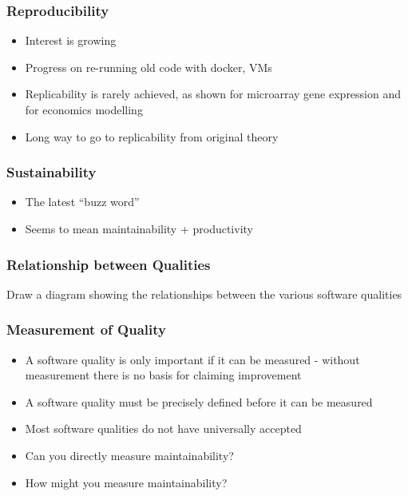 \documentclass[t,12pt,numbers,fleqn]{beamer}
\begin{document}

\begin{frame}
\frametitle{Reproducibility}

\begin{itemize}
\item Interest is growing \cite{BenureauAndRougier2017, BaileyEtAl2016}
\item Progress on re-running old code with docker, VMs
\item Replicability is rarely achieved, as shown for microarray gene expression
  \cite{IoannidisEtAl2009} and for economics modelling
  \cite{IonescuAndJansson2013}
\item Long way to go to replicability from original theory
\end{itemize}

\end{frame}

\begin{frame}
\frametitle{Sustainability}

\begin{itemize}
\item The latest ``buzz word''
\item Seems to mean maintainability + productivity
\end{itemize}

\end{frame}


\begin{frame}
\frametitle{Relationship between Qualities}

Draw a diagram showing the relationships between the various software qualities

\end{frame}


\begin{frame}
\frametitle{Measurement of Quality}

\begin{itemize}
\item A software quality is only important if it can be measured - without
  measurement there is no basis for claiming improvement
\item A software quality must be precisely defined before it can be measured
\item Most software qualities do not have universally accepted
\item Can you directly measure maintainability?
\item How might you measure maintainability?
\end{itemize}

\end{frame}
\end{document}
